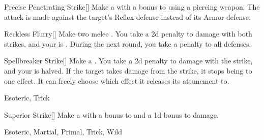 \lowercase{\hypertarget{maneuver:Precise Penetrating Strike}{}}\label{maneuver:Precise Penetrating Strike}
\hypertarget{maneuver:Precise Penetrating Strike}{}
\begin{freeability}[Rank 5]{Precise Penetrating Strike}[]
Make a  with a  bonus to  using a piercing weapon.
The attack is made against the target's Reflex defense instead of its Armor defense.


\end{freeability}
\vspace{0.25em}



\lowercase{\hypertarget{maneuver:Reckless Flurry}{}}\label{maneuver:Reckless Flurry}
\hypertarget{maneuver:Reckless Flurry}{}
\begin{freeability}[Rank 5]{Reckless Flurry}[]
Make two melee .
You take a \minus2d penalty to damage with both strikes, and your  is .
During the next round, you take a  penalty to all defenses.


\end{freeability}
\vspace{0.25em}



\lowercase{\hypertarget{maneuver:Spellbreaker Strike}{}}\label{maneuver:Spellbreaker Strike}
\hypertarget{maneuver:Spellbreaker Strike}{}
\begin{freeability}[Rank 5]{Spellbreaker Strike}[]
Make a .
You take a \minus2d penalty to damage with the strike, and your  is halved.
If the target takes damage from the strike, it stops being  to one effect.
It can freely choose which effect it releases its attunement to.


 Esoteric, Trick
\end{freeability}
\vspace{0.25em}



\lowercase{\hypertarget{maneuver:Superior Strike}{}}\label{maneuver:Superior Strike}
\hypertarget{maneuver:Superior Strike}{}
\begin{freeability}[Rank 5]{Superior Strike}[]
Make a  with a  bonus to  and a \plus1d bonus to damage.


 Esoteric, Martial, Primal, Trick, Wild
\end{freeability}
\vspace{0.25em}



